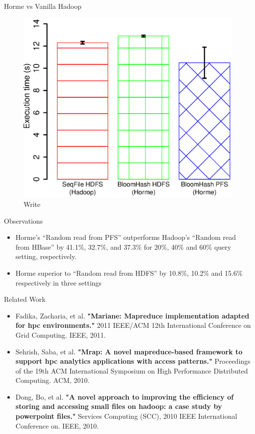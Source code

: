\documentclass[newPxFont]{beamer}
\begin{document}
\begin{frame}[c]{Horme vs Vanilla Hadoop}
\begin{figure}[ht!]
      \includegraphics[scale=0.3]{eval-write}
      \centering
      \caption{Write}
    \end{figure}  
\end{frame}

\begin{frame}[c]{Observations}
  \begin{itemize}
    \item Horme’s “Random read from PFS” outperforms Hadoop’s “Random read from HBase” by 41.1\%, 32.7\%, and 37.3\% for 20\%, 40\% and 60\% query setting, respectively. 
    \item Horme superior to “Random read from HDFS” by 10.8\%, 10.2\% and 15.6\% respectively in three settings
  \end{itemize}
\end{frame}


\begin{frame}[c]{Related Work}
  \begin{itemize}
    \item \small Fadika, Zacharia, et al. \textbf{"Mariane: Mapreduce implementation adapted for hpc environments."} 2011 IEEE/ACM 12th International Conference on Grid Computing. IEEE, 2011.
    \item \small Sehrish, Saba, et al. \textbf{"Mrap: A novel mapreduce-based framework to support hpc analytics applications with access patterns."} Proceedings of the 19th ACM International Symposium on High Performance Distributed Computing. ACM, 2010.
    \item \small Dong, Bo, et al. \textbf{"A novel approach to improving the efficiency of storing and accessing small files on hadoop: a case study by powerpoint files."} Services Computing (SCC), 2010 IEEE International Conference on. IEEE, 2010.
  \end{itemize}
\end{frame}
\end{document}
